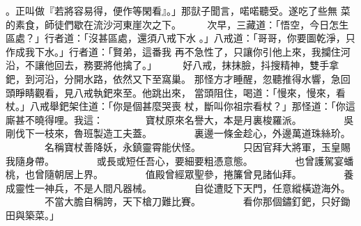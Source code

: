 \begin{pinyinscope}
{。正叫做『若將容易得，便作等閑看』。」那獃子聞言，喏喏聽受。遂吃了些無
菜的素食，師徒們歇在流沙河東崖次之下。
　　
次早，三藏道：「悟空，今日怎生區處？」行者道：「沒甚區處，還須八戒下水
。」八戒道：「哥哥，你要圖乾淨，只作成我下水。」行者道：「賢弟，這番我
再不急性了，只讓你引他上來，我攔住河沿，不讓他回去，務要將他擒了。」
　　
好八戒，抹抹臉，抖搜精神，雙手拿鈀，到河沿，分開水路，依然又下至窩巢。
那怪方才睡醒，忽聽推得水響，急回頭睜睛觀看，見八戒執鈀來至。他跳出來，
當頭阻住，喝道：「慢來，慢來，看杖。」八戒舉鈀架住道：「你是個甚麼哭喪
杖，斷叫你祖宗看杖？」那怪道：「你這廝甚不曉得哩。我這：
　　　　寶杖原來名譽大，本是月裏梭羅派。
　　　　吳剛伐下一枝來，魯班製造工夫蓋。
　　　　裏邊一條金趁心，外邊萬道珠絲玠。
　　　　名稱寶杖善降妖，永鎮靈霄能伏怪。
　　　　只因官拜大將軍，玉皇賜我隨身帶。
　　　　或長或短任吾心，要細要粗憑意態。
　　　　也曾護駕宴蟠桃，也曾隨朝居上界。
　　　　值殿曾經眾聖參，捲簾曾見諸仙拜。
　　　　養成靈性一神兵，不是人間凡器械。
　　　　自從遭貶下天門，任意縱橫遊海外。
　　　　不當大膽自稱誇，天下槍刀難比賽。
　　　　看你那個鏽釘鈀，只好鋤田與築菜。」

}
\end{pinyinscope}
